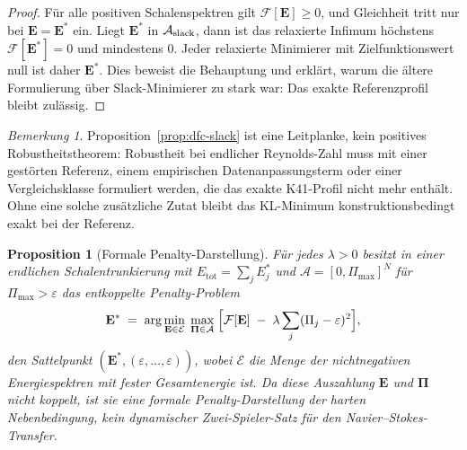 \documentclass[12pt,a4paper]{article}
\theoremstyle{definition}
\theoremstyle{plain}
\newtheorem{proposition}[definition]{Proposition}
\theoremstyle{remark}
\newtheorem{remark}[definition]{Bemerkung}
\begin{document}
\begin{proof}
Für alle positiven Schalenspektren gilt $\mathcal{F}[\mathbf{E}]\ge0$, und
Gleichheit tritt nur bei $\mathbf{E}=\mathbf{E}^*$ ein. Liegt
$\mathbf{E}^*$ in $\mathcal{A}_{\textup{slack}}$, dann ist das relaxierte
Infimum höchstens $\mathcal{F}[\mathbf{E}^*]=0$ und mindestens $0$.
Jeder relaxierte Minimierer mit Zielfunktionswert null ist daher
$\mathbf{E}^*$. Dies beweist die Behauptung und erklärt, warum die ältere
Formulierung über \glqq Slack-Minimierer\grqq{} zu stark war: Das exakte
Referenzprofil bleibt zulässig.
\end{proof}

\begin{remark}
Proposition~\ref{prop:dfc-slack} ist eine Leitplanke, kein positives
Robustheitstheorem: Robustheit bei endlicher Reynolds-Zahl muss mit einer
gestörten Referenz, einem empirischen Datenanpassungsterm oder einer
Vergleichsklasse formuliert werden, die das exakte K41-Profil nicht mehr
enthält. Ohne eine solche zusätzliche Zutat bleibt das KL-Minimum
konstruktionsbedingt exakt bei der Referenz.
\end{remark}

\begin{proposition}[Formale Penalty-Darstellung]
\label{prop:minimax}
Für jedes $\lambda>0$ besitzt in einer endlichen Schalentrunkierung mit
$E_{\mathrm{tot}}=\sum_j E_j^*$ und
$\mathcal{A}=[0,\Pi_{\max}]^N$ für $\Pi_{\max}>\varepsilon$ das
entkoppelte Penalty-Problem
\begin{equation}\label{eq:minimax}
  \mathbf{E}^*
  \;=\;
  \arg\min_{\mathbf{E} \in \mathcal{E}}\;
  \max_{\boldsymbol{\Pi} \in \mathcal{A}}\;
  \Bigl[
    \mathcal{F}[\mathbf{E}]
    \;-\;
    \lambda \sum_j (\Pi_j - \varepsilon)^2
  \Bigr],
\end{equation}
den Sattelpunkt
$(\mathbf{E}^*,(\varepsilon,\ldots,\varepsilon))$, wobei $\mathcal{E}$
die Menge der nichtnegativen Energiespektren mit fester Gesamtenergie ist.
Da diese Auszahlung $\mathbf{E}$ und $\boldsymbol{\Pi}$ nicht koppelt, ist
sie eine formale Penalty-Darstellung der harten Nebenbedingung, kein
dynamischer Zwei-Spieler-Satz für den Navier--Stokes-Transfer.
\end{proposition}
\end{document}
